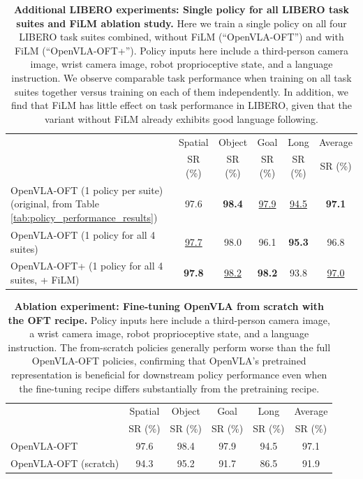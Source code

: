 \documentclass[conference]{IEEEtran}
\begin{document}
\begin{table}[h]
\centering
\caption{\textbf{Additional LIBERO experiments: Single policy for all LIBERO task suites and FiLM ablation study.} Here we train a single policy on all four LIBERO task suites combined, without FiLM (``OpenVLA-OFT'') and with FiLM (``OpenVLA-OFT+''). Policy inputs here include a third-person camera image, wrist camera image, robot proprioceptive state, and a language instruction. We observe comparable task performance when training on all task suites together versus training on each of them independently. In addition, we find that FiLM has little effect on task performance in LIBERO, given that the variant without FiLM already exhibits good language following.}
\label{tab:additional_libero_results}
\begin{tabular}{l|c|c|c|c|c}
\toprule
& Spatial & Object & Goal & Long & Average \\
& SR (\%) & SR (\%) & SR (\%) & SR (\%) & SR (\%) \\
\midrule
OpenVLA-OFT (1 policy per suite) (original, from Table \ref{tab:policy_performance_results}) & 97.6 & \textbf{98.4} & \underline{97.9} & \underline{94.5} & \textbf{97.1}  \\
OpenVLA-OFT (1 policy for all 4 suites) & \underline{97.7} & 98.0 & 96.1 & \textbf{95.3} & 96.8  \\
OpenVLA-OFT+ (1 policy for all 4 suites, + FiLM) & \textbf{97.8} & \underline{98.2} & \textbf{98.2} & 93.8 & \underline{97.0}  \\
\bottomrule
\end{tabular}
\end{table}

\begin{table}[h]
\centering
\caption{\textbf{Ablation experiment: Fine-tuning OpenVLA from scratch with the OFT recipe.}  Policy inputs here include a third-person camera image, a wrist camera image, robot proprioceptive state, and a language instruction. The from-scratch policies generally perform worse than the full OpenVLA-OFT policies, confirming that OpenVLA's pretrained representation is beneficial for downstream policy performance even when the fine-tuning recipe differs substantially from the pretraining recipe.}
\label{tab:app:openvla_scratch_ablation_libero}
\begin{tabular}{l|c|c|c|c|c}
\toprule
& Spatial & Object & Goal & Long & Average \\
& SR (\%) & SR (\%) & SR (\%) & SR (\%) & SR (\%) \\
\midrule
OpenVLA-OFT & 97.6 & 98.4 & 97.9 & 94.5 & 97.1  \\
OpenVLA-OFT (scratch) & 94.3 & 95.2 & 91.7 & 86.5 & 91.9 \\
\bottomrule
\end{tabular}
\end{table}
\end{document}

